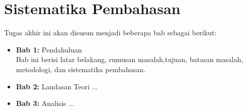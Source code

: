 \section{Sistematika Pembahasan}
\label{sec:sispem}
Tugas akhir ini akan disusun menjadi beberapa bab sebagai berikut:
	\begin{itemize}
		\item \textbf{Bab 1:} Pendahuluan
		\\ Bab ini berisi latar belakang, rumusan masalah,tujuan, batasan masalah, metodologi, dan sistematika pembahasan.
		\item \textbf{Bab 2:} Landasan Teori
		...
		\item \textbf{Bab 3:} Analisis
		...
	\end{itemize}